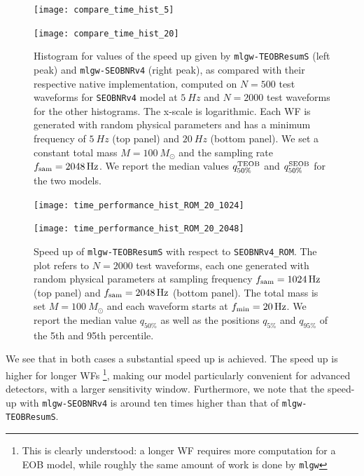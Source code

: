 \newcommand{\factor}{.9}
\begin{figure}
	\centering
	\begin{minipage}{\factor\linewidth}
	    \texttt{[image: compare\_time\_hist\_5]}
	\end{minipage}\hfill
	\begin{minipage}{\factor\linewidth}
	    \texttt{[image: compare\_time\_hist\_20]}
	\end{minipage}

	\caption{
Histogram for values of the speed up given by \texttt{mlgw-TEOBResumS} (left peak) and \texttt{mlgw-SEOBNRv4} (right peak), as compared with their respective native implementation, computed on $N=500$ test waveforms for \texttt{SEOBNRv4} model at $\SI{5}{Hz}$ and $N=2000$ test waveforms for the other histograms. The x-scale is logarithmic. Each WF is generated with random physical 
parameters and has a minimum frequency of $\SI{5}{Hz}$ (top panel) and $\SI{20}{Hz}$ (bottom panel).
We set a constant total mass $M=\SI{100}{M_\odot}$ and the sampling rate $f_{\rm sam} = \SI{2048}{Hz}$.
We report the median values $q^{\rm TEOB}_{50\%}$ and $q^{\rm SEOB}_{50\%}$ for the two models.
}
	\label{fig:time_performance_hist}
\end{figure}
\begin{figure}
	\centering
	\begin{minipage}{\factor\linewidth}
	    \texttt{[image: time\_performance\_hist\_ROM\_20\_1024]}
	\end{minipage}\hfill
	\begin{minipage}{\factor\linewidth}
	    \texttt{[image: time\_performance\_hist\_ROM\_20\_2048]}
	\end{minipage}

	\caption{
	Speed up of \texttt{mlgw-TEOBResumS} with respect to \texttt{SEOBNRv4\_ROM}.
	The plot refers to  $N=2000$ test waveforms, each one generated with random physical 
	parameters at sampling frequency $ f_{\rm sam}=\SI{1024}{Hz}$ (top panel) 
	and $f_{\rm sam}=\SI{2048}{Hz}$ (bottom panel). The total mass is set $M=\SI{100}{M_\odot}$ 
	and each waveform starts at $f_{\rm min} = \SI{20}{Hz}$. We report the median value 
	$q_{50\%}$ as well as the positions $q_{5\%}$ and $q_{95\%}$ of the 5th and 95th percentile.
}
	\label{fig:time_performance_hist_ROM}
\end{figure}

We see that in both cases a substantial speed up is achieved. The speed up is higher for longer WFs
\footnote{This is clearly understood: a longer WF requires more computation for a EOB model, while 
roughly the same amount of work is done by \texttt{mlgw}}, making our model particularly convenient 
for advanced detectors, with a larger sensitivity window.
Furthermore, we note that the speed-up with \texttt{mlgw-SEOBNRv4} is around ten times higher than that of \texttt{mlgw-TEOBResumS}.

